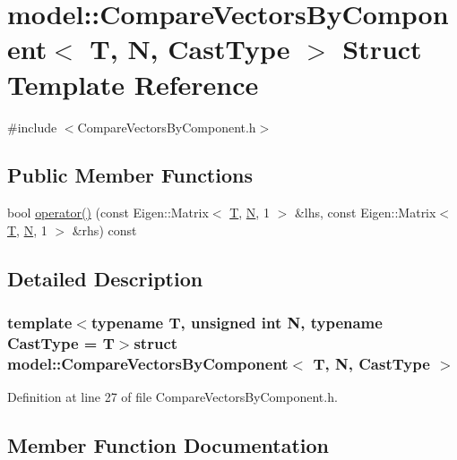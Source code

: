 \hypertarget{structmodel_1_1_compare_vectors_by_component}{}\section{model\+:\+:Compare\+Vectors\+By\+Component$<$ T, N, Cast\+Type $>$ Struct Template Reference}
\label{structmodel_1_1_compare_vectors_by_component}


{\ttfamily \#include $<$Compare\+Vectors\+By\+Component.\+h$>$}

\subsection*{Public Member Functions}
\begin{DoxyCompactItemize}
\item 
bool \hyperlink{structmodel_1_1_compare_vectors_by_component_a60610b4328915cf9a31e50aedfa424a1}{operator()} (const Eigen\+::\+Matrix$<$ \hyperlink{_spline_node_base__corder1_8h_a82692d3a5502b91460591f1d5504314a}{T}, \hyperlink{thompson__tetrahedron_8m_a7823765a845eb81829f110d8337f81ae}{N}, 1 $>$ \&lhs, const Eigen\+::\+Matrix$<$ \hyperlink{_spline_node_base__corder1_8h_a82692d3a5502b91460591f1d5504314a}{T}, \hyperlink{thompson__tetrahedron_8m_a7823765a845eb81829f110d8337f81ae}{N}, 1 $>$ \&rhs) const 
\end{DoxyCompactItemize}


\subsection{Detailed Description}
\subsubsection*{template$<$typename T, unsigned int N, typename Cast\+Type = T$>$struct model\+::\+Compare\+Vectors\+By\+Component$<$ T, N, Cast\+Type $>$}



Definition at line 27 of file Compare\+Vectors\+By\+Component.\+h.



\subsection{Member Function Documentation}
\hypertarget{structmodel_1_1_compare_vectors_by_component_a60610b4328915cf9a31e50aedfa424a1}{}
